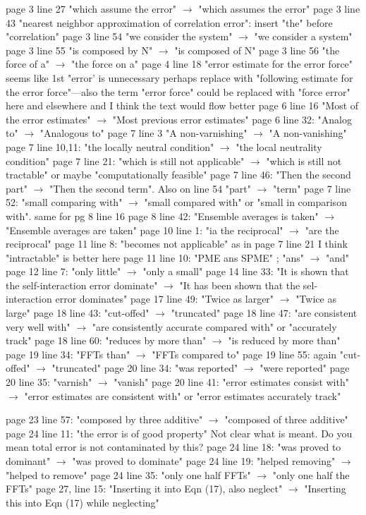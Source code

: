\documentclass[a4paper]{article}
\begin{document}
page 3 line 27 "which assume the error" $\rightarrow$ "which assumes the error"
page 3 line 43 "nearest neighbor approximation of correlation error": insert "the" before "correlation"
page 3 line 54 "we consider the system" $\rightarrow$ "we consider a system"
page 3 line 55 "is composed by N" $\rightarrow$ "is composed of N"
page 3 line 56 "the force of a" $\rightarrow$ "the force on a"
page 4 line 18 "error estimate for the error force" seems like 1st "error' is unnecessary
              perhaps replace with "following estimate for the error force"---also the term "error force" could be
              replaced with "force error" here and elsewhere and I think the text would flow better
page 6 line 16 "Most of the error estimates" $\rightarrow$ "Most previous error estimates"
page 6 line 32: "Analog to" $\rightarrow$ "Analogous to"
page 7 line 3 "A non-varnishing" $\rightarrow$ "A non-vanishing"
page 7 line 10,11: "the locally neutral condition" $\rightarrow$ "the local neutrality condition"
page 7 line 21: "which is still not applicable" $\rightarrow$ "which is still not tractable" or maybe "computationally feasible"
page 7 line 46: "Then the second part" $\rightarrow$ "Then the second term". Also on line 54 "part" $\rightarrow$ "term"
page 7 line 52: "small comparing with" $\rightarrow$ "small compared with" or "small in comparison with". same for pg 8 line 16
page 8 line 42: "Ensemble averages is taken" $\rightarrow$ "Ensemble averages are taken"
page 10 line 1: "ia the reciprocal" $\rightarrow$ "are the reciprocal"
page 11 line 8: "becomes not applicable" as in page 7 line 21 I think "intractable" is better here
page 11 line 10: "PME ans SPME" ; "ans" $\rightarrow$ "and"
page 12 line 7: "only little" $\rightarrow$ "only a small"
page 14 line 33: "It is shown that the self-interaction error dominate" $\rightarrow$ "It has been shown that the sel-interaction
                   error dominates"
page 17 line 49: "Twice as larger" $\rightarrow$ "Twice as large"
page 18 line 43: "cut-offed" $\rightarrow$ "truncated"
page 18 line 47: "are consistent very well with" $\rightarrow$ "are consistently accurate compared with" or "accurately track"
page 18 line 60: "reduces by more than" $\rightarrow$ "is reduced by more than"
page 19 line 34: "FFTs than" $\rightarrow$ "FFTs compared to"
page 19 line 55: again "cut-offed" $\rightarrow$ "truncated"
page 20 line 34: "was reported" $\rightarrow$ "were reported"
page 20 line 35: "varnish" $\rightarrow$ "vanish"
page 20 line 41: "error estimates consist with" $\rightarrow$ "error estimates are consistent with" or
                                                  "error estimates accurately track"

page 23 line 57: "composed by three additive" $\rightarrow$ "composed of three additive"
page 24 line 11: "the error is of good property" Not clear what is meant. Do you mean total error is not
                 contaminated by this?
page 24 line 18: "was proved to dominant" $\rightarrow$ "was proved to dominate"
page 24 line 19: "helped removing" $\rightarrow$ "helped to remove"
page 24 line 35: "only one half FFTs" $\rightarrow$ "only one half the FFTs"
page 27, line 15: "Inserting it into Eqn (17), also neglect" $\rightarrow$ "Inserting this into Eqn (17) while neglecting"
\end{document}
